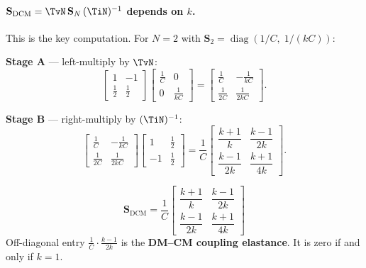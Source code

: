 \paragraph{$\mathbf{S}_{\mathrm{DCM}} = \TvN\,\mathbf{S}_N\,(\TiN)^{-1}$
depends on $k$.}

This is the key computation.  For $N = 2$ with
$\mathbf{S}_2 = \operatorname{diag}(1/C,\;1/(kC))$:

\textbf{Stage A} — left-multiply by $\TvN$:
\[
\begin{bmatrix}1 & -1 \\[3pt] \tfrac{1}{2} & \tfrac{1}{2}\end{bmatrix}
\begin{bmatrix}\tfrac{1}{C} & 0 \\[3pt] 0 & \tfrac{1}{kC}\end{bmatrix}
=
\begin{bmatrix}
    \tfrac{1}{C}  & -\tfrac{1}{kC} \\[6pt]
    \tfrac{1}{2C} & \tfrac{1}{2kC}
\end{bmatrix}.
\]

\textbf{Stage B} — right-multiply by $(\TiN)^{-1}$:
\[
\begin{bmatrix}
    \tfrac{1}{C}  & -\tfrac{1}{kC} \\[6pt]
    \tfrac{1}{2C} & \tfrac{1}{2kC}
\end{bmatrix}
\begin{bmatrix}1 & \tfrac{1}{2} \\[3pt] -1 & \tfrac{1}{2}\end{bmatrix}
=
\frac{1}{C}
\begin{bmatrix}
    \dfrac{k+1}{k}  & \dfrac{k-1}{2k}  \\[10pt]
    \dfrac{k-1}{2k} & \dfrac{k+1}{4k}
\end{bmatrix}.
\]

\begin{eqnbox}[DCM Elastance Matrix ($N = 2$) — Eq.~16 in paper]
\begin{equation}
\mathbf{S}_{\mathrm{DCM}}
= \frac{1}{C}
  \begin{bmatrix}
      \dfrac{k+1}{k}  & \dfrac{k-1}{2k}  \\[10pt]
      \dfrac{k-1}{2k} & \dfrac{k+1}{4k}
  \end{bmatrix}
\label{eq:Sdcm}
\end{equation}
Off-diagonal entry $\tfrac{1}{C}\cdot\tfrac{k-1}{2k}$ is the
\textbf{DM--CM coupling elastance}.
It is zero if and only if $k = 1$.
\end{eqnbox}

